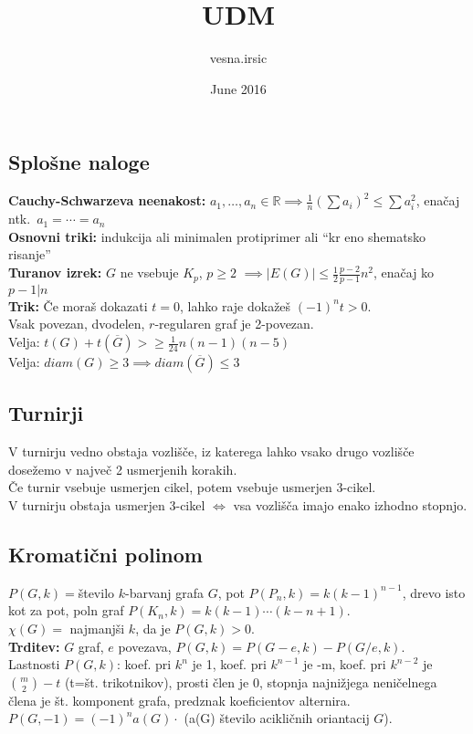 \documentclass{article}
\title{UDM}
\author{vesna.irsic }
\date{June 2016}
\theoremstyle{definition}
\def\R{\mathbb{R}}
\begin{document}
\subsection*{Splošne naloge}
\textbf{Cauchy-Schwarzeva neenakost:} $a_1, \ldots, a_n \in \R \implies \frac{1}{n} (\sum a_i)^2 \leq \sum a_i^2$, enačaj ntk.\ $a_1 = \cdots = a_n$\\
\textbf{Osnovni triki:} indukcija ali minimalen protiprimer ali ``kr eno shematsko risanje''\\
\textbf{Turanov izrek:} $G$ ne vsebuje $K_p$, $p\geq2$ $\implies |E(G)| \leq \frac{1}{2} \frac{p-2}{p-1} n^2$, enačaj ko $p-1 | n$\\
\textbf{Trik:} Če moraš dokazati $t = 0$, lahko raje dokažeš $(-1)^n t > 0$.\\
Vsak povezan, dvodelen, $r$-regularen graf je 2-povezan.\\
Velja: $t(G) + t(\overline{G}) > \geq \frac{1}{24}n (n-1) (n-5)$\\
Velja: $diam(G) \geq 3 \implies diam(\overline{G}) \leq 3$

\subsection*{Turnirji}
V turnirju vedno obstaja vozlišče, iz katerega lahko vsako drugo vozlišče dosežemo v največ 2 usmerjenih korakih.\\
Če turnir vsebuje usmerjen cikel, potem vsebuje usmerjen 3-cikel.\\
V turnirju obstaja usmerjen 3-cikel $\iff$ vsa vozlišča imajo enako izhodno stopnjo.

\subsection*{Kromatični polinom}
$P(G,k) = $število $k$-barvanj grafa $G$, pot $P(P_n,k) = k(k-1)^{n-1}$, drevo isto kot za pot, poln graf $P(K_n,k) = k(k-1)\cdots (k-n+1)$.\\
$\chi(G) = $ najmanjši $k$, da je $P(G,k) > 0$.\\
\textbf{Trditev:} $G$ graf, $e$ povezava, $P(G,k)= P(G-e,k) - P(G/e,k)$.\\
Lastnosti $P(G,k)$: koef. pri $k^n$ je 1, koef. pri $k^{n-1}$ je -m, koef. pri $k^{n-2}$ je $\binom{m}{2} - t$ (t=št. trikotnikov), prosti člen je 0, stopnja najnižjega neničelnega člena je št. komponent grafa, predznak koeficientov alternira. \\
$P(G,-1) = (-1)^n a(G)\cdot$ (a(G) število acikličnih oriantacij $G$).
\end{document}
